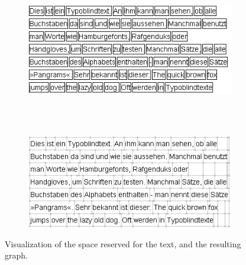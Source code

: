 \documentclass[11pt,a4paper]{vutinfth}
\begin{document}
\begin{figure}
 \centering
 \begin{subfigure}[b]{\textwidth}
 \centering
  \includegraphics[]{WordBoundaries.png}
  \caption{\label{fig:wbound}}
 \end{subfigure}
 \\
 ~\\%
 \begin{subfigure}[b]{\textwidth}
 \centering
  \includegraphics[]{RoutingGraph_edited.png}
  \caption{\label{fig:rgraph}}
 \end{subfigure}
 \caption{Visualization of the space reserved for the text, and the resulting graph.}
\end{figure}
\end{document}
